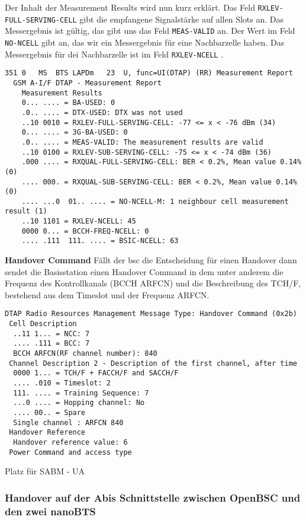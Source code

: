 Der Inhalt der Measurement Results wird nun kurz erklärt. Das Feld \lstinline{RXLEV-FULL-SERVING-CELL} gibt die empfangene Signalstärke auf allen Slots an. Das Messergebnis ist gültig, das gibt uns das Feld \lstinline{MEAS-VALID} an. Der Wert im Feld \lstinline{NO-NCELL} gibt an, das wir ein Messergebnis für eine Nachbarzelle haben. Das Messergebnis für dei Nachbarzelle ist im Feld \lstinline{RXLEV-NCELL} \cite[Table 10.40]{bib:3gpp0408}.

\begin{lstlisting}[label=lst:measurement-result,caption={Measurement Result}]
351	0	MS	BTS	LAPDm	23	U, func=UI(DTAP) (RR) Measurement Report 
  GSM A-I/F DTAP - Measurement Report
    Measurement Results
    0... .... = BA-USED: 0
    .0.. .... = DTX-USED: DTX was not used
    ..10 0010 = RXLEV-FULL-SERVING-CELL: -77 <= x < -76 dBm (34)
    0... .... = 3G-BA-USED: 0
    .0.. .... = MEAS-VALID: The measurement results are valid
    ..10 0100 = RXLEV-SUB-SERVING-CELL: -75 <= x < -74 dBm (36)
    .000 .... = RXQUAL-FULL-SERVING-CELL: BER < 0.2%, Mean value 0.14% (0)
    .... 000. = RXQUAL-SUB-SERVING-CELL: BER < 0.2%, Mean value 0.14% (0)
    .... ...0  01.. .... = NO-NCELL-M: 1 neighbour cell measurement result (1)
    ..10 1101 = RXLEV-NCELL: 45
    0000 0... = BCCH-FREQ-NCELL: 0
    .... .111  111. .... = BSIC-NCELL: 63
\end{lstlisting}

\textbf{Handover Command}
Fällt der \gls{bsc} die Entscheidung für einen Handover dann sendet die Basisstation einen Handover Command in dem unter anderem die Frequenz des Kontrollkanals (\gls{BCCH} \gls{ARFCN}) und die Beschreibung des \gls{TCH/F}, bestehend aus dem Timeslot und der Frequenz \gls{ARFCN}.

\begin{lstlisting}[label=lst:handover-command,caption={Handover Command}]
DTAP Radio Resources Management Message Type: Handover Command (0x2b)
 Cell Description
  ..11 1... = NCC: 7
  .... .111 = BCC: 7
  BCCH ARFCN(RF channel number): 840
 Channel Description 2 - Description of the first channel, after time
  0000 1... = TCH/F + FACCH/F and SACCH/F
  .... .010 = Timeslot: 2
  111. .... = Training Sequence: 7
  ...0 .... = Hopping channel: No
  .... 00.. = Spare
  Single channel : ARFCN 840
 Handover Reference
  Handover reference value: 6
 Power Command and access type
\end{lstlisting}
  
{\LARGE Platz für SABM - UA}

\subsubsection{Handover auf der Abis Schnittstelle zwischen OpenBSC und den zwei nanoBTS}

